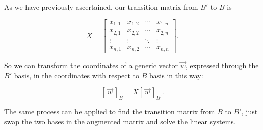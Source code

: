 As we have previously ascertained, our transition matrix from $B'$ to $B$ is 

$$
X = \begin{bmatrix}
    x_{1,1} & x_{1,2} & \cdots & x_{1, n}\\
    x_{2,1} & x_{2,2} & \cdots & x_{2, n}\\
    \vdots  & \vdots & \ddots & \vdots\\
    x_{n,1} & x_{n,2} & \cdots & x_{n, n}
\end{bmatrix}.
$$

So we can transform the coordinates of a generic vector $\vec w$, expressed through the $B'$ basis, in the coordinates with respect to $B$ basis in this way:

$$
[ \ \vec w \ ]_B = X [ \ \vec w \ ]_{B'}.
$$

The same process can be applied to find the transition matrix from $B$ to $B'$, just swap the two bases in the augmented matrix and solve the linear systems.